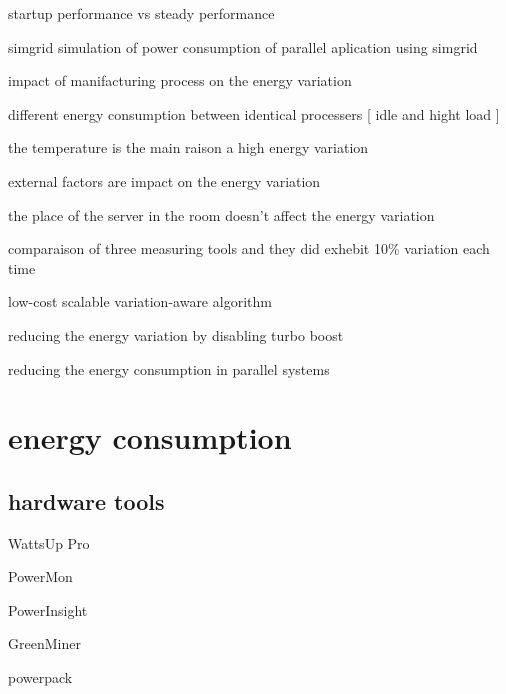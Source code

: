 startup performance vs steady performance \cite{buytaert_statistically_nodate}



simgrid simulation of power consumption of parallel aplication using simgrid \cite{heinrich2017predicting}

impact of manifacturing process on the energy variation \cite{coles2014comparing}

different energy consumption between identical processers [ idle and hight load ]\cite{von2016variations}

the temperature is the main raison a high energy variation \cite{wang2018potential}

external factors are impact on the energy variation \cite{mukherjee2009spatio}

the place of the server in the room doesn't affect the energy variation \cite{diouri2013your}

comparaison of three measuring tools and they did exhebit 10\% variation each time \cite{inadomi2015analyzing}

low-cost scalable variation-aware algorithm \cite{inadomi2015analyzing}

reducing the energy variation by disabling turbo boost \cite{acun2016variation}

reducing the energy consumption in parallel systems \cite{chasapis2016runtime}

\cite{marathe2017empirical}


\section{energy consumption}


\subsection{hardware tools}

WattsUp Pro \cite{hirst2013watts}


PowerMon \cite{bedard2010powermon}

PowerInsight \cite{laros2013powerinsight}

GreenMiner \cite{hindle2014greenminer}

powerpack \cite{ge2009powerpack}


